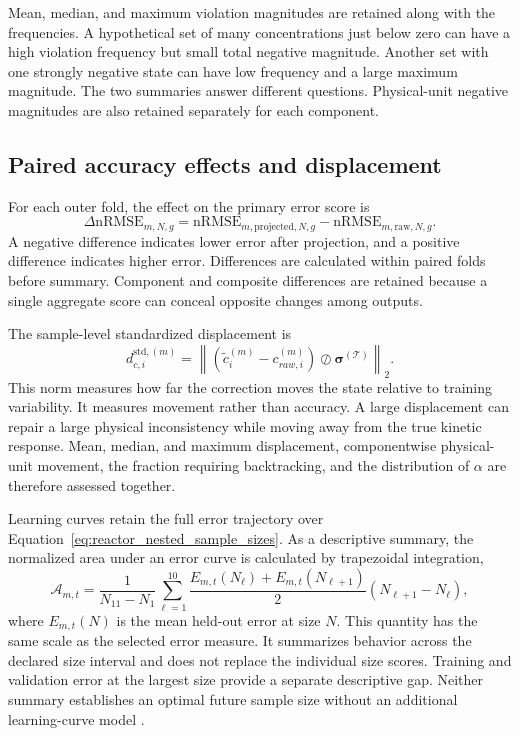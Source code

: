 Mean, median, and maximum violation magnitudes are retained along with the frequencies. A hypothetical set of many concentrations just below zero can have a high violation frequency but small total negative magnitude. Another set with one strongly negative state can have low frequency and a large maximum magnitude. The two summaries answer different questions. Physical-unit negative magnitudes are also retained separately for each component.

\subsection{Paired accuracy effects and displacement}

For each outer fold, the effect on the primary error score is
\begin{equation}
\Delta\mathrm{nRMSE}_{m,N,g}=
\mathrm{nRMSE}_{m,\mathrm{projected},N,g}
-\mathrm{nRMSE}_{m,\mathrm{raw},N,g}.
\label{eq:projection_paired_error_difference}
\end{equation}
A negative difference indicates lower error after projection, and a positive difference indicates higher error. Differences are calculated within paired folds before summary. Component and composite differences are retained because a single aggregate score can conceal opposite changes among outputs.

The sample-level standardized displacement is
\begin{equation}
d_{c,i}^{\mathrm{std},(m)}=
\left\|(\tilde c_i^{(m)}-c_{raw,i}^{(m)})
\oslash\boldsymbol{\sigma}^{(\mathcal{T})}\right\|_2.
\label{eq:projection_standardized_displacement}
\end{equation}
This norm measures how far the correction moves the state relative to training variability. It measures movement rather than accuracy. A large displacement can repair a large physical inconsistency while moving away from the true kinetic response. Mean, median, and maximum displacement, componentwise physical-unit movement, the fraction requiring backtracking, and the distribution of $\alpha$ are therefore assessed together.

Learning curves retain the full error trajectory over Equation~\eqref{eq:reactor_nested_sample_sizes}. As a descriptive summary, the normalized area under an error curve is calculated by trapezoidal integration,
\begin{equation}
\mathcal{A}_{m,t}=
\frac{1}{N_{11}-N_1}
\sum_{\ell=1}^{10}\frac{E_{m,t}(N_\ell)+E_{m,t}(N_{\ell+1})}{2}
(N_{\ell+1}-N_\ell),
\label{eq:projection_learning_curve_area}
\end{equation}
where $E_{m,t}(N)$ is the mean held-out error at size $N$. This quantity has the same scale as the selected error measure. It summarizes behavior across the declared size interval and does not replace the individual size scores. Training and validation error at the largest size provide a separate descriptive gap. Neither summary establishes an optimal future sample size without an additional learning-curve model \citep{VieringLoog2023}.

